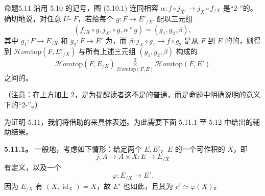 \begin{SGAresult}{命题}{5.11}
沿用 5.10 的记号，图 (5.10.1) 连同相容 $\alpha:f\circ j_{X'}\to j_X\circ f_{/X}$ 是“2-”的。确切地说，对任意 $U$- $F$，若给每个 $g:F\to E'_{/X'}$ 配以三元组
\[(f_{/X}\circ g,j_{X'}\circ g,\alpha*g)=(g_1,g_2,\beta),\]
其中 $g_1:F\to E_{/X}$ 和 $g_2:F\to E'$ 为，而 $\beta:j_X\circ g_1\to f\circ g_2$ 是从 $F$ 到 $E$ 的的，则得到 $\mathscr{H}om\mathrm{top}(F,E'_{/X})$ 与所有上述三元组 $(g_1,g_2,\beta)$ 构成的
\[\mathscr{H}om\mathrm{top}(F,E_{/X})\mathbin{\mathop{\times}\limits^{2}_{\mathscr{H}om\mathrm{top}(F,E)}}\mathscr{H}om\mathrm{top}(F,E')\]
之间的。
\end{SGAresult}
（注意：在上方加上 $2$，是为提醒读者这不是的普通，而是命题中明确说明的意义下的“2-”。）

为证明 5.11，我们将借助的来具体表述。为此需要下面 5.11.1 至 5.12 中给出的辅助结果。

\textbf{5.11.1。} 一般地，考虑如下情形：给定两个 $E,E'$，$E$ 的一个可作积的 $X$，即
\[j:A\longmapsto A\times X:E\longrightarrow E_{/X}\]
有定义，以及一个
\[\varphi:E_{/X}\longrightarrow E'.\tag{*}\]
因为 $E_{/X}$ 有 $(X,\operatorname{id}_X)=X$，故 $E'$ 也如此，且其为 $e'\simeq\varphi(X)$。

